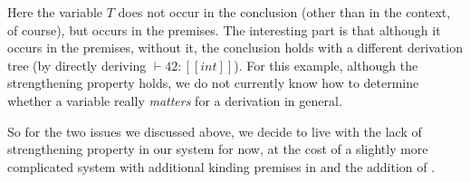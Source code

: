 \noindent Here the variable $T$ does not occur in the conclusion
(other than in the context, of course), but occurs in
the premises. The interesting part is that although it occurs in the premises, without
it, the conclusion holds with a different derivation tree (by directly deriving $\vdash 42 : [[int]]$).
For this example, although the strengthening property holds, we do not currently
know how to determine whether a variable really \emph{matters} for a derivation
in general.

So for the two issues we discussed above, we decide to live with the lack of
strengthening property in our system for now, at the cost of a slightly more
complicated system with additional kinding premises in 
and the addition of .

